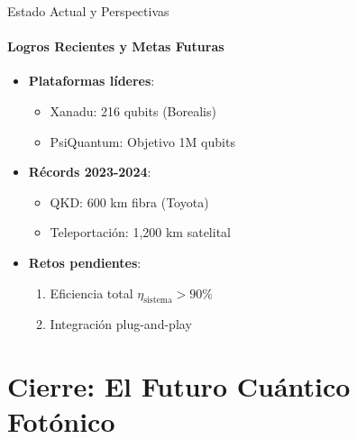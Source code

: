\documentclass{beamer}
\begin{document}
\begin{frame}{Estado Actual y Perspectivas}
\framesubtitle{Logros Recientes y Metas Futuras}

\begin{itemize}
    \item \textbf{Plataformas líderes}:
    \begin{itemize}
        \item Xanadu: 216 qubits (Borealis)
        \item PsiQuantum: Objetivo 1M qubits
    \end{itemize}
    
    \item \textbf{Récords 2023-2024}:
    \begin{itemize}
        \item QKD: 600 km fibra (Toyota)
        \item Teleportación: 1,200 km satelital
    \end{itemize}
    
    \item \textbf{Retos pendientes}:
    \begin{enumerate}
        \item Eficiencia total \( \eta_{\text{sistema}} > 90\% \)
        \item Integración plug-and-play
    \end{enumerate}
\end{itemize}
\end{frame}

\section{Cierre: El Futuro Cuántico Fotónico}
\end{document}
